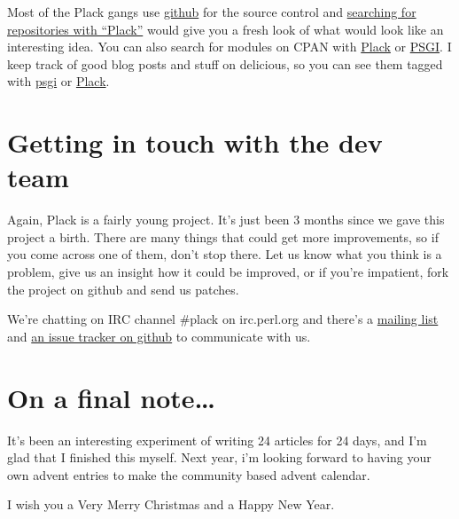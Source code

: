 Most of the Plack gangs use \href{http://github.com/}{github} for the
source control and
\href{http://github.com/search?langOverride=\&q=plack\&repo=\&start_value=1\&type=Repositories}{searching
for repositories with ``Plack''} would give you a fresh look of what
would look like an interesting idea. You can also search for modules on
CPAN with
\href{http://search.cpan.org/search?query=plack\&mode=module}{Plack} or
\href{http://search.cpan.org/search?query=psgi\&mode=module}{PSGI}. I
keep track of good blog posts and stuff on delicious, so you can see
them tagged with \href{http://delicious.com/miyagawa/psgi}{psgi} or
\href{http://delicious.com/miyagawa/plack}{Plack}.

\section{Getting in touch with the dev
team}\label{getting-in-touch-with-the-dev-team}

Again, Plack is a fairly young project. It's just been 3 months since we
gave this project a birth. There are many things that could get more
improvements, so if you come across one of them, don't stop there. Let
us know what you think is a problem, give us an insight how it could be
improved, or if you're impatient, fork the project on github and send us
patches.

We're chatting on IRC channel \#plack on irc.perl.org and there's a
\href{http://groups.google.com/group/psgi-plack}{mailing list} and
\href{http://github.com/plack/Plack/issues}{an issue tracker on github}
to communicate with us.

\section{On a final note\ldots{}}\label{on-a-final-note}

It's been an interesting experiment of writing 24 articles for 24 days,
and I'm glad that I finished this myself. Next year, i'm looking forward
to having your own advent entries to make the community based advent
calendar.

I wish you a Very Merry Christmas and a Happy New Year.
